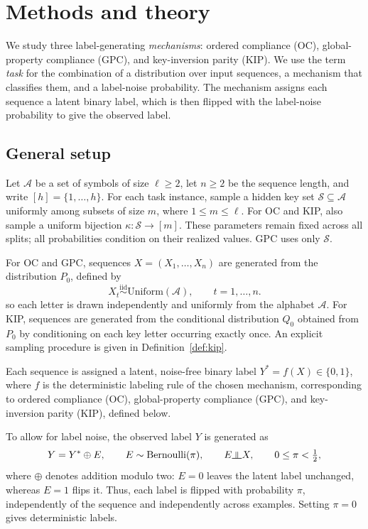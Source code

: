 \documentclass{article} %
\newcommand{\indep}{\rotatebox[origin=c]{90}{$\models$}}
\theoremstyle{plain}
\theoremstyle{definition}
\theoremstyle{remark}
\begin{document}
\section{Methods and theory}
\label{sec:formulation}
We study three label-generating \emph{mechanisms}: ordered compliance (OC), global-property compliance (GPC), and key-inversion parity (KIP). We use the term \emph{task} for the combination of a distribution over input sequences, a mechanism that classifies them, and a label-noise probability. The mechanism assigns each sequence a latent binary label, which is then flipped with the label-noise probability to give the observed label.

\subsection{General setup}
\label{sec:setup}
Let $\mathcal{A}$ be a set of symbols of size $\ell\geq2$, let $n\geq2$ be the sequence length, and write $[h]=\{1,\ldots,h\}$. For each task instance, sample a hidden key set $\mathcal{S}\subseteq\mathcal{A}$ uniformly among subsets of size $m$, where $1\leq m\leq\ell$. For OC and KIP, also sample a uniform bijection $\kappa:\mathcal{S}\to[m]$. These parameters remain fixed across all splits; all probabilities condition on their realized values. GPC uses only $\mathcal{S}$.

For OC and GPC, sequences $X=(X_1,\ldots,X_n)$ are generated
from the distribution $P_0$, defined by
\[
X_t \stackrel{\mathrm{iid}}{\sim} \mathrm{Uniform}(\mathcal{A}),
\qquad t=1,\ldots,n.
\]
so each letter is drawn independently and uniformly from the alphabet $\mathcal{A}$. For KIP, sequences are generated from the conditional distribution
$Q_0$ obtained from $P_0$ by conditioning on each key letter occurring exactly once. An explicit sampling procedure is given in
Definition~\ref{def:kip}.

Each sequence is assigned a latent, noise-free binary label
$Y^*=f(X)\in\{0,1\}$, where $f$ is the deterministic labeling
rule of the chosen mechanism,
corresponding to ordered compliance (OC), global-property
compliance (GPC), and key-inversion parity (KIP), defined below.

To allow for label noise, the observed label $Y$ is generated as
\begin{equation}
\label{eq:label_noise}
Y=Y^*\oplus E,
\qquad E\sim\mathrm{Bernoulli}(\pi),
\qquad E\indep X,
\qquad 0\leq\pi<\tfrac12,
\end{equation}
where $\oplus$ denotes addition modulo two: $E=0$ leaves the
latent label unchanged, whereas $E=1$ flips it. Thus, each label
is flipped with probability $\pi$, independently of the sequence
and independently across examples. Setting $\pi=0$ gives
deterministic labels.
\end{document}
